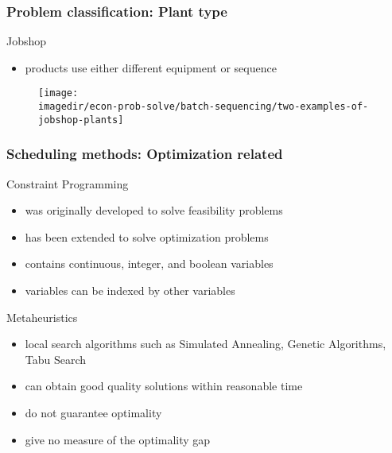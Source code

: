\begin{frame}\frametitle{Problem classification: Plant type}
	
	{\color{purple}Jobshop}
	\begin{itemize}
		\item	products use either different equipment or sequence\\
	\end{itemize}
	\begin{figure}
		[!htb] 
		\begin{center}
			\texttt{[image: \\imagedir/econ-prob-solve/batch-sequencing/two-examples-of-jobshop-plants]}
			
			\label{fig:job} 
		\end{center}
	\end{figure}
	
	\cite{turton}
\end{frame}

\begin{frame}\frametitle{Scheduling methods: Optimization related}
	
	Constraint Programming 
	\begin{itemize}
		\item	was originally developed to solve feasibility problems 
		\item	has been extended to solve optimization problems 
		\item	contains continuous, integer, and boolean variables 
		\item	variables can be indexed by other variables \cite{MendyNco06} 
	\end{itemize}
	
	Metaheuristics
	\begin{itemize}
		\item	local search algorithms such as Simulated Annealing, Genetic Algorithms, Tabu Search \cite{MendyNco06} 
		\item	can obtain good quality solutions within reasonable time 
		\item	do not guarantee optimality 
		\item	give no measure of the optimality gap 
	\end{itemize}
\end{frame}

